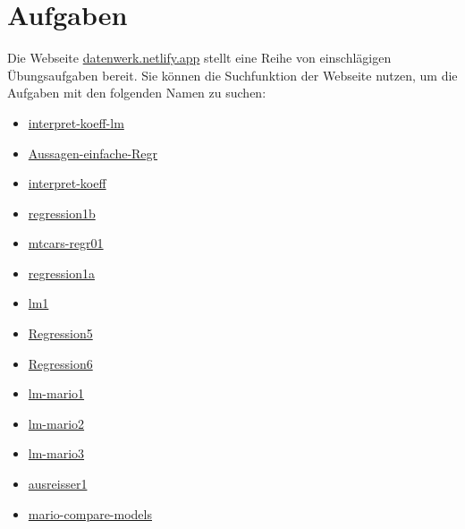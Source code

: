 \documentclass[
  letterpaper,
  twoside,
  open=any]{scrbook}
\providecommand{\tightlist}{%
  \setlength{\itemsep}{0pt}\setlength{\parskip}{0pt}}\usepackage{longtable,booktabs,array}
\theoremstyle{definition}
\theoremstyle{definition}
\theoremstyle{definition}
\theoremstyle{remark}
\begin{document}
\section{Aufgaben}\label{aufgaben-8}

Die Webseite \href{https://datenwerk.netlify.app}{datenwerk.netlify.app}
stellt eine Reihe von einschlägigen Übungsaufgaben bereit. Sie können
die Suchfunktion der Webseite nutzen, um die Aufgaben mit den folgenden
Namen zu suchen:

\begin{itemize}
\tightlist
\item
  \href{https://sebastiansauer.github.io/Datenwerk/posts/interpret-koeff-lm/interpret-koeff-lm.html}{interpret-koeff-lm}
\item
  \href{https://sebastiansauer.github.io/Datenwerk/posts/aussagen-einfache-regr/aussagen-einfache-regr}{Aussagen-einfache-Regr}
\item
  \href{https://sebastiansauer.github.io/Datenwerk/posts/interpret-koeff/interpret-koeff.html}{interpret-koeff}
\item
  \href{https://sebastiansauer.github.io/Datenwerk/posts/regression1b/regression1b.html}{regression1b}
\item
  \href{https://sebastiansauer.github.io/Datenwerk/posts/mtcars-regr01/mtcars-regr01.html}{mtcars-regr01}
\item
  \href{https://sebastiansauer.github.io/Datenwerk/posts/regression1a/regression1a.html}{regression1a}
\item
  \href{https://sebastiansauer.github.io/Datenwerk/posts/lm1/lm1.html}{lm1}
\item
  \href{https://sebastiansauer.github.io/Datenwerk/posts/regression5/regression5}{Regression5}
\item
  \href{https://sebastiansauer.github.io/Datenwerk/posts/regression6/regression6}{Regression6}
\item
  \href{https://sebastiansauer.github.io/Datenwerk/posts/lm-mario1/lm-mario1.html}{lm-mario1}
\item
  \href{https://sebastiansauer.github.io/Datenwerk/posts/lm-mario2/lm-mario2.html}{lm-mario2}
\item
  \href{https://sebastiansauer.github.io/Datenwerk/posts/lm-mario3/lm-mario3.html}{lm-mario3}
\item
  \href{https://sebastiansauer.github.io/Datenwerk/posts/ausreisser1/ausreisser1.html}{ausreisser1}
\item
  \href{https://sebastiansauer.github.io/Datenwerk/posts/mario-compare-models/}{mario-compare-models}
\end{itemize}
\end{document}
